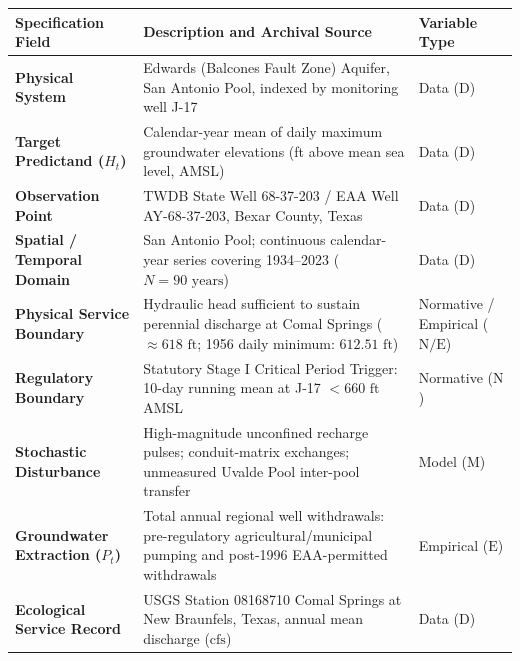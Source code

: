 \documentclass[11pt]{article}
\begin{document}
{\def\LTcaptype{none} %
\begin{longtable}[]{@{}
  >{\raggedright\arraybackslash}p{}
  >{\raggedright\arraybackslash}p{}
  >{\centering\arraybackslash}p{}@{}}
\toprule\noalign{}
\begin{minipage}[b]{\linewidth}\raggedright
Specification Field
\end{minipage} & \begin{minipage}[b]{\linewidth}\raggedright
Description and Archival Source
\end{minipage} & \begin{minipage}[b]{\linewidth}\centering
Variable Type
\end{minipage} \\
\midrule\noalign{}
\endhead
\bottomrule\noalign{}
\endlastfoot
\textbf{Physical System} & Edwards (Balcones Fault Zone) Aquifer, San
Antonio Pool, indexed by monitoring well J-17 & Data (\(\mathrm{D}\)) \\
\textbf{Target Predictand (\(H_t\))} & Calendar-year mean of daily
maximum groundwater elevations (ft above mean sea level, AMSL) & Data
(\(\mathrm{D}\)) \\
\textbf{Observation Point} & TWDB State Well 68-37-203 / EAA Well
AY-68-37-203, Bexar County, Texas & Data (\(\mathrm{D}\)) \\
\textbf{Spatial / Temporal Domain} & San Antonio Pool; continuous
calendar-year series covering 1934--2023 (\(N = 90\text{ years}\)) &
Data (\(\mathrm{D}\)) \\
\textbf{Physical Service Boundary} & Hydraulic head sufficient to
sustain perennial discharge at Comal Springs (\(\approx 618\text{ ft}\);
1956 daily minimum: \(612.51\text{ ft}\)) & Normative / Empirical
(\(\mathrm{N / E}\)) \\
\textbf{Regulatory Boundary} & Statutory Stage I Critical Period
Trigger: 10-day running mean at J-17 \(< 660\text{ ft}\) AMSL &
Normative (\(\mathrm{N}\)) \\
\textbf{Stochastic Disturbance} & High-magnitude unconfined recharge
pulses; conduit-matrix exchanges; unmeasured Uvalde Pool inter-pool
transfer & Model (\(\mathrm{M}\)) \\
\textbf{Groundwater Extraction (\(P_t\))} & Total annual regional well
withdrawals: pre-regulatory agricultural/municipal pumping and post-1996
EAA-permitted withdrawals & Empirical (\(\mathrm{E}\)) \\
\textbf{Ecological Service Record} & USGS Station 08168710 Comal Springs
at New Braunfels, Texas, annual mean discharge (\(\text{cfs}\)) & Data
(\(\mathrm{D}\)) \\
\end{longtable}
}
\end{document}
